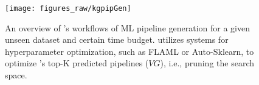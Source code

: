 \begin{figure}
\ncp\ncp
 \centering
   \texttt{[image: figures\_raw/kgpipGen]} 
  \ncp\ncp\ncp\ncp\ncp\ncp\ncp\ncp\ncp
  \caption{An overview of {\sysname}'s workflows of ML pipeline generation for a given unseen dataset and certain time budget. {\sysname} utilizes systems for hyperparameter optimization, such as FLAML or Auto-Sklearn, to optimize {\sysname}'s top-K predicted pipelines ($VG$), i.e., pruning the search space.}
  \ncp\ncp\ncp\ncp\ncp\ncp\ncp\ncp
  \label{fig:kgpipGen}
\end{figure}